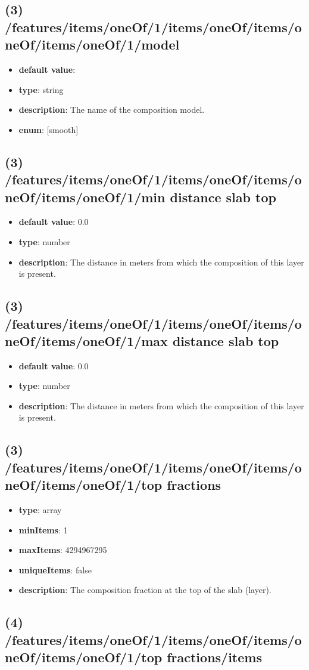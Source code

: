 \subsection{(3) /features/items/oneOf/1/items/oneOf/items/oneOf/items/oneOf/1/model}
\begin{itemize}[leftmargin=3em]\item {\bf default value}: 
\item {\bf type}: string
\item {\bf description}: The name of the composition model.
\item {\bf enum}: [smooth]\end{itemize}\subsection{(3) /features/items/oneOf/1/items/oneOf/items/oneOf/items/oneOf/1/min distance slab top}
\begin{itemize}[leftmargin=3em]\item {\bf default value}: 0.0
\item {\bf type}: number
\item {\bf description}: The distance in meters from which the composition of this layer is present.
\end{itemize}\subsection{(3) /features/items/oneOf/1/items/oneOf/items/oneOf/items/oneOf/1/max distance slab top}
\begin{itemize}[leftmargin=3em]\item {\bf default value}: 0.0
\item {\bf type}: number
\item {\bf description}: The distance in meters from which the composition of this layer is present.
\end{itemize}\subsection{(3) /features/items/oneOf/1/items/oneOf/items/oneOf/items/oneOf/1/top fractions}
\begin{itemize}[leftmargin=3em]\item {\bf type}: array
\item {\bf minItems}: 1
\item {\bf maxItems}: 4294967295
\item {\bf uniqueItems}: false
\item {\bf description}: The composition fraction at the top of the slab (layer).
\end{itemize}\subsection{(4) /features/items/oneOf/1/items/oneOf/items/oneOf/items/oneOf/1/top fractions/items}
